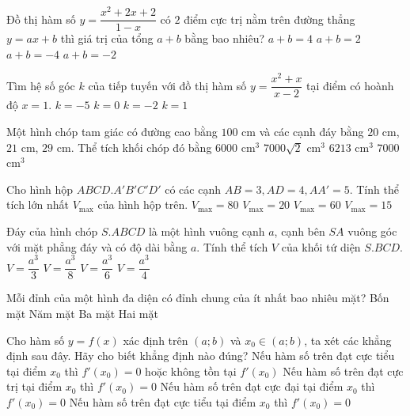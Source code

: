 \begin{ex}%
Đồ thị hàm số $y=\dfrac{x^2+2x+2}{1-x}$ có $2$ điểm cực trị nằm trên đường thẳng $y=ax+b$ thì giá trị của tổng $a+b$ bằng bao nhiêu?
\choice
{$a+b=4$}
{$a+b=2$}
{\True $a+b=-4$}
{$a+b=-2$}
\end{ex}
\begin{ex}%
Tìm hệ số góc $k$ của tiếp tuyến với đồ thị hàm số $y=\dfrac{x^2+x}{x-2}$ tại điểm có hoành độ $x=1$.
\choice
{\True $k=-5$}
{$k=0$}
{$k=-2$}
{$k=1$}
\end{ex}
\begin{ex}%
Một hình chóp tam giác có đường cao bằng $100$ cm và các cạnh đáy bằng $20$ cm, $21$ cm, $29$ cm. Thể tích khối chóp đó bằng
\choice
{$6000$ cm$^3$}
{$7000\sqrt{2}$ cm$^3$}
{$6213$ cm$^3$}
{\True $7000$ cm$^3$}
\end{ex}
\begin{ex}%
Cho hình hộp $ABCD.A'B'C'D'$ có các cạnh $AB=3,AD=4,AA'=5$. Tính thể tích lớn nhất $V_{\max}$ của hình hộp trên.
\choice
{$V_{\max}=80$}
{$V_{\max}=20$}
{\True $V_{\max}=60$}
{$V_{\max}=15$}
\end{ex}
\begin{ex}%
Đáy của hình chóp $S.ABCD$ là một hình vuông cạnh $a$, cạnh bên $SA$ vuông góc với mặt phẳng đáy và có độ dài bằng $a$. Tính thể tích $V$ của khối tứ diện $S.BCD$.
\choice
{\True $V=\dfrac{a^3}{3}$}
{$V=\dfrac{a^3}{8}$}
{$V=\dfrac{a^3}{6}$}
{$V=\dfrac{a^3}{4}$}
\end{ex}
\begin{ex}%
Mỗi đỉnh của một hình đa diện có đỉnh chung của ít nhất bao nhiêu mặt?
\choice
{Bốn mặt}
{Năm mặt}
{\True Ba mặt}
{Hai mặt}
\end{ex}
\begin{ex}%
Cho hàm số $y=f(x)$ xác định trên $(a;b)$ và $x_0\in (a;b)$, ta xét các khẳng định sau đây. Hãy cho biết khẳng định nào đúng?
\choice
{\True Nếu hàm số trên đạt cực tiểu tại điểm $x_0$ thì $f'(x_0)=0$ hoặc không tồn tại $f'(x_0)$}
{Nếu hàm số trên đạt cực trị tại điểm $x_0$ thì $f'(x_0)=0$}
{Nếu hàm số trên đạt cực đại tại điểm $x_0$ thì $f'(x_0)=0$}
{Nếu hàm số trên đạt cực tiểu tại điểm $x_0$ thì $f'(x_0)=0$}
\end{ex}
